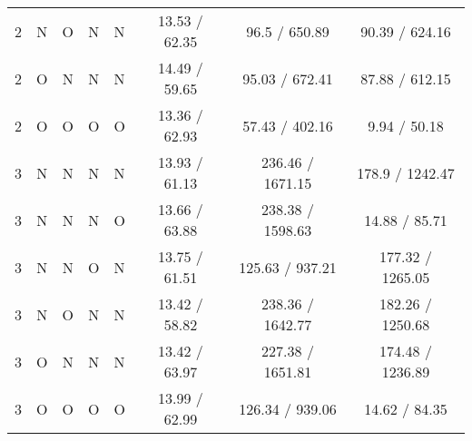 \begin{table}[hlc]
\begin{tabular}{|c |c|c|c|c| |c | c|c|}
2 & N& O& N& N & 13.53 / 62.35 & 96.5 / 650.89 & 90.39 / 624.16 \\
2 & O& N& N& N & 14.49 / 59.65 & 95.03 / 672.41 & 87.88 / 612.15 \\
2 & O& O& O& O & 13.36 / 62.93 & 57.43 / 402.16 & 9.94 / 50.18 \\
\hline
\hline
3 & N& N& N& N & 13.93 / 61.13 & 236.46 / 1671.15 & 178.9 / 1242.47 \\
3 & N& N& N& O & 13.66 / 63.88 & 238.38 / 1598.63 & 14.88 / 85.71 \\
3 & N& N& O& N & 13.75 / 61.51 & 125.63 / 937.21 & 177.32 / 1265.05 \\
3 & N& O& N& N & 13.42 / 58.82 & 238.36 / 1642.77 & 182.26 / 1250.68 \\
3 & O& N& N& N & 13.42 / 63.97 & 227.38 / 1651.81 & 174.48 / 1236.89 \\
3 & O& O& O& O & 13.99 / 62.99 & 126.34 / 939.06 & 14.62 / 84.35 \\
\hline
\end{tabular}
\end{table}




	
